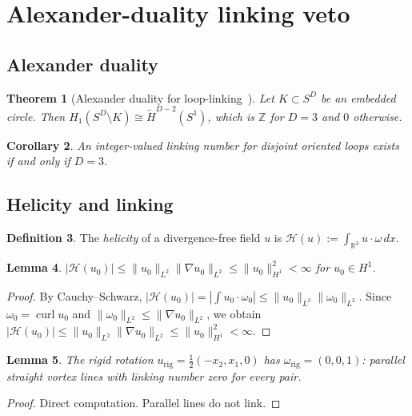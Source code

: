 \documentclass[12pt, reqno]{amsart}
\newtheorem{theorem}{Theorem}[section]
\newtheorem{lemma}[theorem]{Lemma}
\newtheorem{corollary}[theorem]{Corollary}
\theoremstyle{definition}
\newtheorem{definition}[theorem]{Definition}
\theoremstyle{remark}
\numberwithin{equation}{section}
\newcommand{\R}{\mathbb{R}}
\newcommand{\Z}{\mathbb{Z}}
\DeclareMathOperator{\curl}{curl}
\begin{document}
\section{Alexander-duality linking veto}\label{sec:veto}

\subsection{Alexander duality}

\begin{theorem}[Alexander duality for loop-linking~{\cite[Ch.\,3]{Hatcher}}]%
\label{thm:alex}
Let $K\subset S^D$ be an embedded circle.  Then
$H_1(S^D\setminus K)\cong\widetilde H^{D-2}(S^1)$, which is $\Z$ for
$D=3$ and $0$ otherwise.
\end{theorem}

\begin{corollary}\label{cor:D3-linking}
An integer-valued linking number for disjoint oriented loops exists if
and only if $D=3$.
\end{corollary}

\subsection{Helicity and linking}

\begin{definition}\label{def:helicity}
The \emph{helicity} of a divergence-free field $u$ is
$\mathcal H(u):=\int_{\R^3}u\cdot\omega\,dx$.
\end{definition}

\begin{lemma}\label{lem:helicity-finite}
$|\mathcal H(u_0)|\le\|u_0\|_{L^2}\|\nabla u_0\|_{L^2}
\le\|u_0\|_{H^1}^2<\infty$ for $u_0\in H^1$.
\end{lemma}
\begin{proof}
By Cauchy--Schwarz,
$|\mathcal H(u_0)|=|\int u_0\cdot\omega_0|\le\|u_0\|_{L^2}\|\omega_0\|_{L^2}$.
Since $\omega_0=\curl u_0$ and
$\|\omega_0\|_{L^2}\le\|\nabla u_0\|_{L^2}$,
we obtain $|\mathcal H(u_0)|\le\|u_0\|_{L^2}\|\nabla u_0\|_{L^2}
\le\|u_0\|_{H^1}^2<\infty$.
\end{proof}

\begin{lemma}\label{lem:rigid-linking}
The rigid rotation $u_{\mathrm{rig}}=\tfrac12(-x_2,x_1,0)$ has
$\omega_{\mathrm{rig}}=(0,0,1)$: parallel straight vortex lines with
linking number zero for every pair.
\end{lemma}
\begin{proof}
Direct computation.  Parallel lines do not link.
\end{proof}
\end{document}
